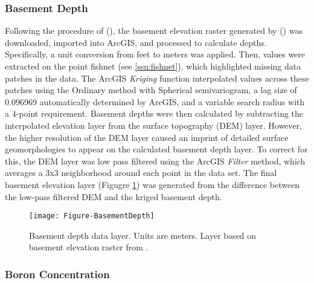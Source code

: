 \subsubsection{Basement Depth}

Following the procedure of \citeauthor{pepin_new_2018} (\citeyear{pepin_new_2018}), the basement elevation raster generated by \citeauthor{bielicki_hydrogeolgic_2015} (\citeyear{bielicki_hydrogeolgic_2015}) was downloaded, imported into ArcGIS, and processed to calculate depths. Specifically, a unit conversion from feet to meters was applied. Then, values were extracted on the point fishnet (see \ref{ssn:fishnet}), which highlighted missing data patches in the data. The ArcGIS \textit{Kriging} function interpolated values across these patches using the Ordinary method with Spherical semivariogram, a lag size of 0.096969 automatically determined by ArcGIS, and a variable search radius with a 4-point requirement. Basement depths were then calculated by subtracting the interpolated elevation layer from the surface topography (DEM) layer. However, the higher resolution of the DEM layer caused an imprint of detailed surface geomorphologies to appear on the calculated basement depth layer. To correct for this, the DEM layer was low pass filtered using the ArcGIS \textit{Filter} method, which averages a 3x3 neighborhood around each point in the data set. The final basement elevation layer (Figugre \ref{fig:feat_basementdepth}) was generated from the difference between the low-pass filtered DEM and the kriged basement depth.

\begin{figure}[h!]
\centering
\texttt{[image: Figure-BasementDepth]}
\caption[Basement depth data layer]{Basement depth data layer. Units are meters. Layer based on basement elevation raster from \protect\citep{bielicki_hydrogeolgic_2015}.}
\label{fig:feat_basementdepth}
\end{figure}

\subsubsection{Boron Concentration}

